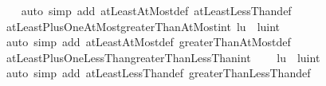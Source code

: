 \begin{isabellebody}
%
\isadelimproof
\ \ %
\endisadelimproof
%
\isatagproof
{}\isamarkupfalse%
\ {\isacharparenleft}{\kern0pt}auto\ simp\ add{\isacharcolon}{\kern0pt}\ atLeastAtMost{\isacharunderscore}{\kern0pt}def\ atLeastLessThan{\isacharunderscore}{\kern0pt}def{\isacharparenright}{\kern0pt}%
\endisatagproof
{\isafoldproof}%
%
\isadelimproof
\isanewline
%
\endisadelimproof
\isanewline
{}\isamarkupfalse%
\ atLeastPlusOneAtMost{\isacharunderscore}{\kern0pt}greaterThanAtMost{\isacharunderscore}{\kern0pt}int{\isacharcolon}{\kern0pt}\ {\isachardoublequoteopen}{\isacharbraceleft}{\kern0pt}l{\isacharplus}{\kern0pt}{}{\isachardot}{\kern0pt}{\isachardot}{\kern0pt}u{\isacharbraceright}{\kern0pt}\ {\isacharequal}{\kern0pt}\ {\isacharbraceleft}{\kern0pt}l{\isacharless}{\kern0pt}{\isachardot}{\kern0pt}{\isachardot}{\kern0pt}{\isacharparenleft}{\kern0pt}u{\isacharcolon}{\kern0pt}{\isacharcolon}{\kern0pt}int{\isacharparenright}{\kern0pt}{\isacharbraceright}{\kern0pt}{\isachardoublequoteclose}\isanewline
%
\isadelimproof
\ \ %
\endisadelimproof
%
\isatagproof
{}\isamarkupfalse%
\ {\isacharparenleft}{\kern0pt}auto\ simp\ add{\isacharcolon}{\kern0pt}\ atLeastAtMost{\isacharunderscore}{\kern0pt}def\ greaterThanAtMost{\isacharunderscore}{\kern0pt}def{\isacharparenright}{\kern0pt}%
\endisatagproof
{\isafoldproof}%
%
\isadelimproof
\isanewline
%
\endisadelimproof
\isanewline
{}\isamarkupfalse%
\ atLeastPlusOneLessThan{\isacharunderscore}{\kern0pt}greaterThanLessThan{\isacharunderscore}{\kern0pt}int{\isacharcolon}{\kern0pt}\isanewline
\ \ \ \ {\isachardoublequoteopen}{\isacharbraceleft}{\kern0pt}l{\isacharplus}{\kern0pt}{}{\isachardot}{\kern0pt}{\isachardot}{\kern0pt}{\isacharless}{\kern0pt}u{\isacharbraceright}{\kern0pt}\ {\isacharequal}{\kern0pt}\ {\isacharbraceleft}{\kern0pt}l{\isacharless}{\kern0pt}{\isachardot}{\kern0pt}{\isachardot}{\kern0pt}{\isacharless}{\kern0pt}u{\isacharcolon}{\kern0pt}{\isacharcolon}{\kern0pt}int{\isacharbraceright}{\kern0pt}{\isachardoublequoteclose}\isanewline
%
\isadelimproof
\ \ %
\endisadelimproof
%
\isatagproof
{}\isamarkupfalse%
\ {\isacharparenleft}{\kern0pt}auto\ simp\ add{\isacharcolon}{\kern0pt}\ atLeastLessThan{\isacharunderscore}{\kern0pt}def\ greaterThanLessThan{\isacharunderscore}{\kern0pt}def{\isacharparenright}{\kern0pt}%
\endisatagproof
{\isafoldproof}%
%
\isadelimproof
%
\endisadelimproof
%
\isadelimdocument
%
\endisadelimdocument
%
\isatagdocument
%
\isamarkuptrue%
%
\endisatagdocument
{\isafolddocument}%
%
\isadelimdocument

\end{isabellebody}
